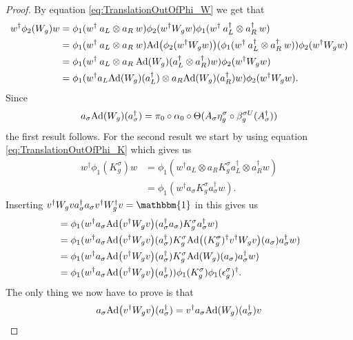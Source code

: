 \documentclass[12pt,a4paper,twoside]{article}
\newcommand{\stkout}[1]{\ifmmode\text{\sout{\ensuremath{#1}}}\else\sout{#1}\fi}
\let\originalleft\left
\let\originalright\right
\renewcommand{\left}{\mathopen{}\mathclose\bgroup\originalleft}
\renewcommand{\right}{\aftergroup\egroup\originalright}
\newcommand{\id}{\mathbbm{1}}
\newcommand{\Ad}[1]{\textrm{Ad}\left(#1\right)}
\theoremstyle{definition}
\numberwithin{equation}{section}
\begin{document}
\begin{proof}
	By equation \eqref{eq:TranslationOutOfPhi_W} we get that
	\begin{align}
		w^\dagger\phi_2(W_g)w&=\phi_1(w^\dagger \: a_L\otimes a_R \: w)\phi_2(w^\dagger W_g w)\phi_1(w^\dagger \: a_L^\dagger\otimes a_R^\dagger \: w)\\
		&=\phi_1(w^\dagger \: a_L\otimes a_R \: w)\Ad{\phi_2(w^\dagger W_g w)}(\phi_1(w^\dagger \: a_L^\dagger\otimes a_R^\dagger \: w))\phi_2(w^\dagger W_g w)\\
		&=\phi_1(w^\dagger \: a_L\otimes a_R \:\Ad{W_g}(a_L^\dagger\otimes a_R^\dagger)w)\phi_2(w^\dagger W_g w)\\
		&=\phi_1(w^\dagger a_L\Ad{W_g}(a_L^\dagger)\otimes a_R \Ad{W_g}( a_R^\dagger)w)\phi_2(w^\dagger W_g w).
	\end{align}
	Since
	\begin{equation}
		a_\sigma\Ad{W_g}(a_\sigma^\dagger)=\pi_0\circ\alpha_0\circ\Theta(A_\sigma\eta_g^\sigma\circ\beta_g^{\sigma U}(A_\sigma^\dagger))
	\end{equation}
	the first result follows. For the second result we start by using equation \eqref{eq:TranslationOutOfPhi_K} which gives us
	\begin{align}
		w^\dagger \phi_1(K_g^\sigma)w&=\phi_1(w^\dagger a_L\otimes a_R K_g^\sigma a_L^\dagger\otimes a_R^\dagger w)\\
		&=\phi_1(w^\dagger a_\sigma K_g^\sigma a_\sigma^\dagger w).
	\end{align}
	Inserting $v^\dagger W_g va_\sigma^\dagger a_\sigma v^\dagger W_g^\dagger v=\id$ in this gives us
	\begin{align}
		&=\phi_1(w^\dagger a_\sigma \Ad{v^\dagger W_g v}(a_\sigma^\dagger a_\sigma) K_g^\sigma a_\sigma^\dagger w)\\
		&=\phi_1(w^\dagger a_\sigma \Ad{v^\dagger W_g v}(a_\sigma^\dagger)K_g^\sigma  \Ad{(K_g^\stkout{\sigma})^\dagger v^\dagger W_g v}(a_\sigma) a_\sigma^\dagger w)\\
		&=\phi_1(w^\dagger a_\sigma \Ad{v^\dagger W_g v}(a_\sigma^\dagger)K_g^\sigma  \Ad{W_g}(a_\sigma) a_\sigma^\dagger w)\\
		&=\phi_1(w^\dagger a_\sigma \Ad{v^\dagger W_g v}(a_\sigma^\dagger))\phi_1(K_g^\sigma)\phi_1(\epsilon_g^\sigma)^\dagger.
	\end{align}
	The only thing we now have to prove is that
	\begin{equation}\label{eq:5.126}
		a_\sigma \Ad{v^\dagger W_g v}(a_\sigma^\dagger)=v^\dagger a_\sigma \Ad{W_g}(a_\sigma^\dagger)v

\end{equation}
\end{proof}
\end{document}

